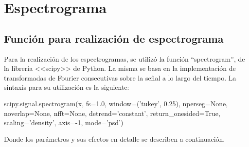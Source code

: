 \documentclass[assd_tp2_main.tex]{subfiles}
\begin{document}
\section{Espectrograma}

\subsection{Funci\'on para realizaci\'on de espectrograma}

Para la realizaci\'on de los espectrogramas, se utiliz\'o la funci\'on ``spectrogram'', de la librer\'ia <<scipy>> de Python. La misma se basa en la implementaci\'on de transformadas de Fourier consecutivas sobre la se\~nal a lo largo del tiempo. La sintaxis para su utilizaci\'on es la siguiente:

\begin{center}
scipy.signal.spectrogram(x, fs=1.0, window=('tukey', 0.25), nperseg=None, noverlap=None, nfft=None, detrend='constant', return\_onesided=True, scaling='density', axis=-1, mode='psd')
\end{center}

Donde los par\'ametros y sus efectos en detalle se describen a continuaci\'on.
\end{document}
